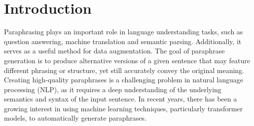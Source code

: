 \documentclass[fleqn,moreauthors,10pt]{ds_report}
\affiliation{\textit{Advisers: Slavko Žitnik}}
\begin{document}
\flushbottom

\maketitle

\thispagestyle{empty}


\section*{Introduction}

Paraphrasing plays an important role in language understanding tasks, such as question answering, machine translation and semantic parsing. Additionally, it serves as a useful method for data augmentation. The goal of paraphrase generation is to produce alternative versions of a given sentence that may feature different phrasing or structure, yet still accurately convey the original meaning. Creating high-quality paraphrases is a challenging problem in natural language processing (NLP), as it requires a deep understanding of the underlying semantics and syntax of the input sentence. In recent years, there has been a growing interest in using machine learning techniques, particularly transformer models, to automatically generate paraphrases.
\end{document}
